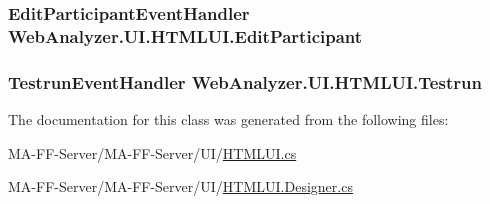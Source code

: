 \subsubsection[{Edit\+Participant}]{\setlength{\rightskip}{0pt plus 5cm}Edit\+Participant\+Event\+Handler Web\+Analyzer.\+U\+I.\+H\+T\+M\+L\+U\+I.\+Edit\+Participant}\label{class_web_analyzer_1_1_u_i_1_1_h_t_m_l_u_i_a41d7bba18de0e030779e1bc57de9d267}
\hypertarget{class_web_analyzer_1_1_u_i_1_1_h_t_m_l_u_i_adb77cf3b6fe81466fc13561570764024}{}
\subsubsection[{Testrun}]{\setlength{\rightskip}{0pt plus 5cm}Testrun\+Event\+Handler Web\+Analyzer.\+U\+I.\+H\+T\+M\+L\+U\+I.\+Testrun}\label{class_web_analyzer_1_1_u_i_1_1_h_t_m_l_u_i_adb77cf3b6fe81466fc13561570764024}


The documentation for this class was generated from the following files\+:\begin{DoxyCompactItemize}
\item 
M\+A-\/\+F\+F-\/\+Server/\+M\+A-\/\+F\+F-\/\+Server/\+U\+I/\hyperlink{_h_t_m_l_u_i_8cs}{H\+T\+M\+L\+U\+I.\+cs}\item 
M\+A-\/\+F\+F-\/\+Server/\+M\+A-\/\+F\+F-\/\+Server/\+U\+I/\hyperlink{_h_t_m_l_u_i_8_designer_8cs}{H\+T\+M\+L\+U\+I.\+Designer.\+cs}\end{DoxyCompactItemize}
